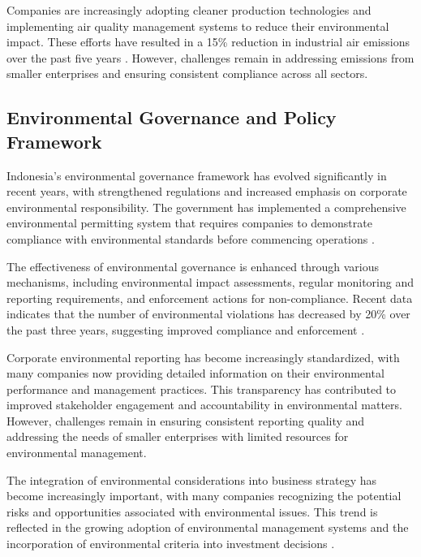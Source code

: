 Companies are increasingly adopting cleaner production technologies and implementing air quality management systems to reduce their environmental impact. These efforts have resulted in a 15\% reduction in industrial air emissions over the past five years \cite{ref_id15}. However, challenges remain in addressing emissions from smaller enterprises and ensuring consistent compliance across all sectors.

\subsection{Environmental Governance and Policy Framework}

Indonesia's environmental governance framework has evolved significantly in recent years, with strengthened regulations and increased emphasis on corporate environmental responsibility. The government has implemented a comprehensive environmental permitting system that requires companies to demonstrate compliance with environmental standards before commencing operations \cite{ref_id16}.

The effectiveness of environmental governance is enhanced through various mechanisms, including environmental impact assessments, regular monitoring and reporting requirements, and enforcement actions for non-compliance. Recent data indicates that the number of environmental violations has decreased by 20\% over the past three years, suggesting improved compliance and enforcement \cite{ref_id17}.

Corporate environmental reporting has become increasingly standardized, with many companies now providing detailed information on their environmental performance and management practices. This transparency has contributed to improved stakeholder engagement and accountability in environmental matters. However, challenges remain in ensuring consistent reporting quality and addressing the needs of smaller enterprises with limited resources for environmental management.

The integration of environmental considerations into business strategy has become increasingly important, with many companies recognizing the potential risks and opportunities associated with environmental issues. This trend is reflected in the growing adoption of environmental management systems and the incorporation of environmental criteria into investment decisions \cite{ref_id18}.